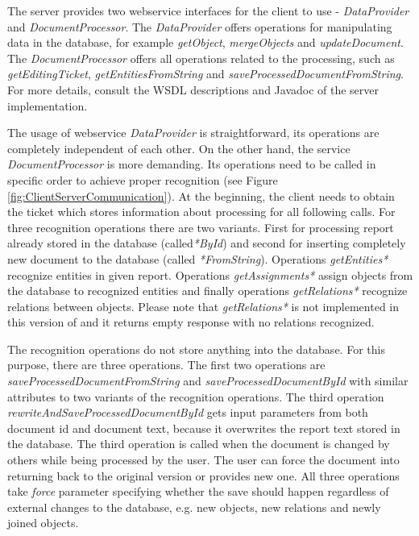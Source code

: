 The \textan{} server provides two webservice interfaces for the client to use -
\emph{DataProvider} and \emph{DocumentProcessor}. The
\emph{DataProvider} offers operations for manipulating data in the database,
for example \emph{getObject}, \emph{mergeObjects} and \emph{updateDocument}.
The \emph{DocumentProcessor} offers all operations related to the processing,
such as \emph{getEditingTicket}, \emph{getEntitiesFromString} and
\emph{saveProcessedDocumentFromString}.
For more details, consult the WSDL descriptions and Javadoc of the server
implementation.

The usage of webservice \emph{DataProvider} is straightforward, its operations
are completely independent of each other. On the other hand, the service
\emph{DocumentProcessor} is more demanding. Its operations need to be
called in specific order to achieve proper recognition (see Figure
\ref{fig:ClientServerCommunication}). At the beginning, the client needs to obtain
the ticket which stores information about processing for all
following calls. For three recognition operations there are two variants. First
for processing report already stored in the database (called\emph{*ById}) and
second for inserting completely new document to the database (called
\emph{*FromString}). Operations \emph{getEntities*} recognize entities in
given report. Operations \emph{getAssignments*} assign objects from the database
to recognized entities and finally operations \emph{getRelations*} recognize
relations between objects. Please note that \emph{getRelations*} is not
implemented in this version of \textan{} and it returns empty response with no
relations recognized.

The recognition operations do not store anything into the database. For this
purpose, there are three operations. The first two operations are \emph{saveProcessedDocumentFromString} 
and \emph{saveProcessedDocumentById} with similar attributes to 
two variants of the recognition operations.
The third operation \emph{rewriteAndSaveProcessedDocumentById} gets input
parameters from both document id and document text, because it overwrites the report
text stored in the database. The third operation is called when the document is
changed by others while being processed by the user. The user can
force the document into returning back to the original version or provides new one. 
All three operations
take \emph{force} parameter specifying whether the save should happen regardless of
external changes to the database, e.g. new objects, new
relations and newly joined objects.

